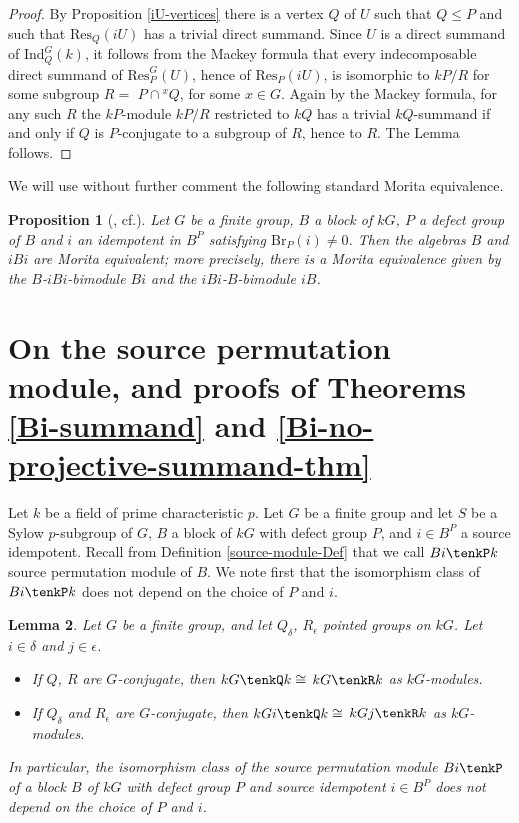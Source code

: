 \documentclass{amsart}
\theoremstyle{plain}\newtheorem{Theorem}{Theorem}[section]
\theoremstyle{plain}\newtheorem{Conjecture}[Theorem]{Conjecture}
\theoremstyle{plain}\newtheorem{Corollary}[Theorem]{Corollary}
\theoremstyle{plain}\newtheorem{Lemma}[Theorem]{Lemma}
\theoremstyle{plain}\newtheorem{Proposition}[Theorem]{Proposition}
\theoremstyle{definition}\newtheorem{Definition}[Theorem]{Definition}
\theoremstyle{definition}\newtheorem{Example}[Theorem]{Example}
\theoremstyle{definition}\newtheorem{Examples}[Theorem]{Examples}
\theoremstyle{definition}\newtheorem{Exercise}[Theorem]{Exercise}
\theoremstyle{definition}\newtheorem{Notation}[Theorem]{Notation}
\theoremstyle{definition}\newtheorem{Remark}[Theorem]{Remark}
\theoremstyle{definition}\newtheorem{Remarks}[Theorem]{Remarks}
\theoremstyle{plain}\newtheorem{Statement}[Theorem]{}
\def\Br{\mathrm{Br}}                 \def\ten{\otimes}
\def\Ind{\mathrm{Ind}}    \def\tenC{\otimes_C}
\def\Res{\mathrm{Res}}           \def\tenOR{\otimes_{\mathcal{O}R}}
\begin{document}
\begin{proof}
By  Proposition  \ref{iU-vertices} there is a vertex $Q$ of $U$ such that $Q\leq P$ and
such that $\Res_{Q}(iU)$ has a trivial direct summand.
Since $U$ is a direct summand of $\Ind^G_Q(k)$, it follows from the Mackey formula
that every indecomposable direct summand of $\Res^G_P(U)$, hence of $\Res_P(iU)$,
is isomorphic to $kP/R$ for some subgroup $R=$ $P\cap {^x{Q}}$, for some
$x\in G$. Again by the Mackey formula, for any such $R$ the $kP$-module 
$kP/R$ restricted to $kQ$ has
a trivial $kQ$-summand if and only if $Q$ is $P$-conjugate to a subgroup of  
$R$, hence to $R$. The Lemma follows.
\end{proof}

We will use without further comment the following standard Morita equivalence.

\begin{Proposition} [{\cite[3.5]{Puigpoint}, cf.\cite[Theorem 6.4.6]{LiBookII}}]
\label{BiMorita}
Let $G$ be a finite group, $B$ a block of $kG$, $P$ a defect group of $B$ and
$i$ an idempotent in $B^P$ satisfying $\Br_P(i)\neq 0$.
Then the algebras $B$ and $iBi$ are Morita equivalent; more precisely, there
is a Morita equivalence given by the $B$-$iBi$-bimodule $Bi$ and the
$iBi$-$B$-bimodule $iB$.
\end{Proposition}


\section{On the source permutation module, and proofs of Theorems
\ref{Bi-summand} and \ref{Bi-no-projective-summand-thm} } \label{Sylow-section}

Let $k$ be a field of prime characteristic $p$.
Let $G$ be a finite group and let $S$ be a Sylow $p$-subgroup of $G$, $B$ a block
of $kG$ with defect group $P$, and $i\in B^P$ a source idempotent. Recall
from Definition \ref{source-module-Def} that we call $Bi\tenkP k$  source
permutation module of $B$. We note first that the isomorphism class of 
$Bi\tenkP k$ does not depend on the choice of $P$ and $i$. 

\begin{Lemma} \label{isomorphic-summands-Lemma}
Let $G$ be a finite group, and let $Q_\delta$, $R_\epsilon$ pointed groups on 
$kG$.  Let $i\in \delta$ and $j\in \epsilon$. 
\begin{itemize}
\item[{\rm (i)}] 
If $Q$, $R$ are $G$-conjugate, then $kG\tenkQ k\cong$ $kG\tenkR k$  as $kG$-modules.
\item[{\rm (ii)}]
If $Q_\delta$ and $R_\epsilon$ are  $G$-conjugate, then $kGi\tenkQ k\cong$ 
$kGj\tenkR k$ as $kG$-modules.
\end{itemize}
In particular, the isomorphism class of the source permutation module $Bi\tenkP$ 
of a block $B$ of $kG$ with defect group $P$ and source idempotent $i\in B^P$ 
does not depend on the choice of $P$ and $i$.
\end{Lemma}
\end{document}
